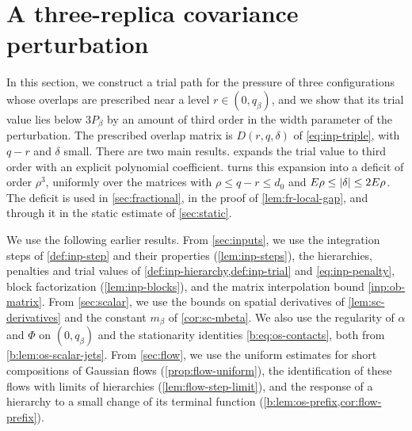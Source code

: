 \chapter{A three-replica covariance perturbation}\label{sec:cubic}

In this section, we construct a trial path for the pressure of three
configurations whose overlaps are prescribed near a level
$r\in(0,q_\beta)$, and we show that its trial value lies below $3P_\beta$ by
an amount of third order in the width parameter of the perturbation. The prescribed
overlap matrix is $D(r,q,\delta)$ of \eqref{eq:inp-triple}, with $q-r$ and
$\delta$ small. There are two main results. 
expands the trial value to third order with an explicit polynomial
coefficient.  turns this expansion into a
deficit of order $\rho^3$, uniformly over the matrices with
$\rho\le q-r\le d_0$ and $E\rho\le\lvert \delta\rvert\le2E\rho$. The deficit is used in
\cref{sec:fractional}, in the proof of \cref{lem:fr-local-gap}, and through it
in the static estimate of \cref{sec:static}.

We use the following earlier results. From \cref{sec:inputs}, we use the
integration steps of \cref{def:inp-step} and their properties
(\cref{lem:inp-steps}), the hierarchies, penalties and trial values of
\cref{def:inp-hierarchy,def:inp-trial} and \eqref{eq:inp-penalty}, block
factorization (\cref{lem:inp-blocks}), and the matrix interpolation bound
\cref{inp:ob-matrix}. From \cref{sec:scalar}, we use the bounds on spatial
derivatives of \cref{lem:sc-derivatives} and the constant
$m_\beta$ of \cref{cor:sc-mbeta}. We also use the regularity of $\alpha$ and
$\Phi$ on $(0,q_\beta)$ and the stationarity identities
\eqref{b:eq:os-contacts}, both from \cref{b:lem:os-scalar-jets}. From \cref{sec:flow}, we use the uniform
estimates for short compositions of Gaussian flows (\cref{prop:flow-uniform}),
the identification of these flows with limits of hierarchies
(\cref{lem:flow-step-limit}), and the response of a hierarchy to a small
change of its terminal function (\cref{b:lem:os-prefix,cor:flow-prefix}).

